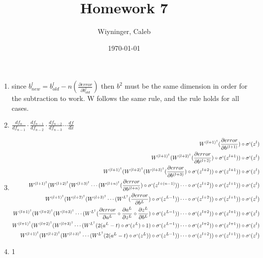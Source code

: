 \documentclass{homework}
\author{Wiyninger, Caleb}
\title{Homework 7}
\date{\today}
\begin{document}
 \maketitle

\begin{enumerate}

\item
\begin{sol}
    since $b_{new}^l = b_{old}^l - n(\frac{\partial error}{\partial b_{old}^l})$
    then $b^2$ must be the same dimension in order for the subtraction to work.
    W follows the same rule, and the rule holds for all cases.
\end{sol}

\item
\begin{sol}
    $\frac{df_n}{df_{n-1}}\cdot\frac{df_{n-1}}{df_{n-2}}\cdot\frac{df_{n-2}}{df_{n-3}}\cdots\frac{df}{dx}$
\end{sol}

\item
\begin{sol}
    \begin{align*}
        W^{(l+1)^\dagger}(\frac{\partial error}{\partial b^{(l+1)}})\circ\sigma `(z^l) \\
        W^{(l+1)^\dagger}(W^{(l+2)^\dagger}(\frac{\partial error}{\partial b^{(l+2)}})\circ\sigma `(z^{l+1}))\circ\sigma `(z^l) \\
        W^{(l+1)^\dagger}(W^{(l+2)^\dagger}(W^{(l+3)^\dagger}(\frac{\partial error}{\partial b^{(l+3)}})\circ\sigma `(z^{l+2}))\circ\sigma `(z^{l+1}))\circ\sigma `(z^l) \\
        W^{(l+1)^\dagger}(W^{(l+2)^\dagger}(W^{(l+3)^\dagger}\cdots(W^{(l+n)^\dagger}(\frac{\partial error}{\partial b^{(l+n)}})\circ\sigma `(z^{l+(n-1)}))\cdots\circ\sigma `(z^{l+2}))\circ\sigma `(z^{l+1}))\circ\sigma `(z^l) \\
        W^{(l+1)^\dagger}(W^{(l+2)^\dagger}(W^{(l+3)^\dagger}\cdots(W^{L^\dagger}(\frac{\partial error}{\partial b^{L}})\circ\sigma `(z^{L-1}))\cdots\circ\sigma `(z^{l+2}))\circ\sigma `(z^{l+1}))\circ\sigma `(z^l) \\
        W^{(l+1)^\dagger}(W^{(l+2)^\dagger}(W^{(l+3)^\dagger}\cdots(W^{L^\dagger}(\frac{\partial error}{\partial a^{L}}\circ\frac{\partial a^L}{\partial z^{L}}\circ\frac{\partial z^L}{\partial b^{L}})\circ\sigma `(z^{L-1}))\cdots\circ\sigma `(z^{l+2}))\circ\sigma `(z^{l+1}))\circ\sigma `(z^l) \\
        W^{(l+1)^\dagger}(W^{(l+2)^\dagger}(W^{(l+3)^\dagger}\cdots(W^{L^\dagger}(2(a^L-t)\circ\sigma `(z^L)\circ1)\circ\sigma `(z^{L-1}))\cdots\circ\sigma `(z^{l+2}))\circ\sigma `(z^{l+1}))\circ\sigma `(z^l) \\
        W^{(l+1)^\dagger}(W^{(l+2)^\dagger}(W^{(l+3)^\dagger}\cdots(W^{L^\dagger}(2(a^L-t)\circ\sigma `(z^L))\circ\sigma `(z^{L-1}))\cdots\circ\sigma `(z^{l+2}))\circ\sigma `(z^{l+1}))\circ\sigma `(z^l) \\
    \end{align*}
\end{sol}

\item
\begin{sol}
    1
\end{sol}



\end{enumerate}
\end{document}
